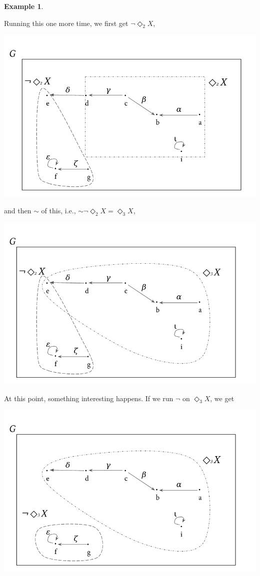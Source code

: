 \documentclass[11pt]{book}
\theoremstyle{definition}
\newtheorem{example}{Example}[section]
\theoremstyle{definition}
\theoremstyle{definition}
\theoremstyle{theorem}
\theoremstyle{definition}
\begin{document}
\begin{example}
\begin{center}
	\end{center}  
	Running this one more time, we first get $\neg \Diamond_2 X$, 
	\begin{center}
		\includegraphics*[scale=0.24]{GraphSubgraphNegation7.png}
	\end{center}  
	and then $\sim$ of this, i.e., $\sim \neg \Diamond_2 X = \Diamond_3 X$, 
	\begin{center}
		\includegraphics*[scale=0.24]{GraphSubgraphNegation8.png}
	\end{center}  
	At this point, something interesting happens. If we run $\neg$ on $\Diamond_3 X$, we get
	\begin{center}
		\includegraphics*[scale=0.24]{GraphSubgraphNegation9.png}

\end{center}
\end{example}
\end{document}
